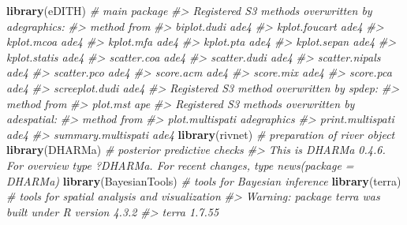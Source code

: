 \documentclass[
]{article}
\newenvironment{Shaded}{\begin{snugshade}}{\end{snugshade}}
\newcommand{\CommentTok}[1]{\textcolor[rgb]{0.56,0.35,0.01}{\textit{#1}}}
\newcommand{\FunctionTok}[1]{\textcolor[rgb]{0.13,0.29,0.53}{\textbf{#1}}}
\newcommand{\NormalTok}[1]{#1}
\begin{document}
\begin{Shaded}
\begin{Highlighting}[]
\FunctionTok{library}\NormalTok{(eDITH)          }\CommentTok{\# main package}
\CommentTok{\#\textgreater{} Registered S3 methods overwritten by \textquotesingle{}adegraphics\textquotesingle{}:}
\CommentTok{\#\textgreater{}   method         from}
\CommentTok{\#\textgreater{}   biplot.dudi    ade4}
\CommentTok{\#\textgreater{}   kplot.foucart  ade4}
\CommentTok{\#\textgreater{}   kplot.mcoa     ade4}
\CommentTok{\#\textgreater{}   kplot.mfa      ade4}
\CommentTok{\#\textgreater{}   kplot.pta      ade4}
\CommentTok{\#\textgreater{}   kplot.sepan    ade4}
\CommentTok{\#\textgreater{}   kplot.statis   ade4}
\CommentTok{\#\textgreater{}   scatter.coa    ade4}
\CommentTok{\#\textgreater{}   scatter.dudi   ade4}
\CommentTok{\#\textgreater{}   scatter.nipals ade4}
\CommentTok{\#\textgreater{}   scatter.pco    ade4}
\CommentTok{\#\textgreater{}   score.acm      ade4}
\CommentTok{\#\textgreater{}   score.mix      ade4}
\CommentTok{\#\textgreater{}   score.pca      ade4}
\CommentTok{\#\textgreater{}   screeplot.dudi ade4}
\CommentTok{\#\textgreater{} Registered S3 method overwritten by \textquotesingle{}spdep\textquotesingle{}:}
\CommentTok{\#\textgreater{}   method   from}
\CommentTok{\#\textgreater{}   plot.mst ape}
\CommentTok{\#\textgreater{} Registered S3 methods overwritten by \textquotesingle{}adespatial\textquotesingle{}:}
\CommentTok{\#\textgreater{}   method             from       }
\CommentTok{\#\textgreater{}   plot.multispati    adegraphics}
\CommentTok{\#\textgreater{}   print.multispati   ade4       }
\CommentTok{\#\textgreater{}   summary.multispati ade4}
\FunctionTok{library}\NormalTok{(rivnet)         }\CommentTok{\# preparation of river object}
\FunctionTok{library}\NormalTok{(DHARMa)         }\CommentTok{\# posterior predictive checks}
\CommentTok{\#\textgreater{} This is DHARMa 0.4.6. For overview type \textquotesingle{}?DHARMa\textquotesingle{}. For recent changes, type news(package = \textquotesingle{}DHARMa\textquotesingle{})}
\FunctionTok{library}\NormalTok{(BayesianTools)  }\CommentTok{\# tools for Bayesian inference}
\FunctionTok{library}\NormalTok{(terra)          }\CommentTok{\# tools for spatial analysis and visualization}
\CommentTok{\#\textgreater{} Warning: package \textquotesingle{}terra\textquotesingle{} was built under R version 4.3.2}
\CommentTok{\#\textgreater{} terra 1.7.55}
\end{Highlighting}
\end{Shaded}
\end{document}
